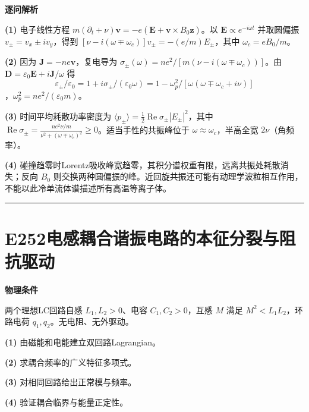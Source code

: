 \documentclass[UTF8,a4paper,11pt,oneside,openany]{ctexbook}
\begin{document}
\par\medskip\noindent\textbf{逐问解析}
\par\noindent\textbf{(1)} 电子线性方程 \(m(\partial_t+\nu)\boldsymbol v=-e(\boldsymbol E+\boldsymbol v\times B_0\hat{\boldsymbol z})\)。以 \(\boldsymbol E\propto e^{-i\omega t}\) 并取圆偏振 \(v_\pm=v_x\pm iv_y\)，得到 \([\nu-i(\omega\mp\omega_c)]v_\pm=-(e/m)E_\pm\)，其中 \(\omega_c=eB_0/m\)。
\par\noindent\textbf{(2)} 因为 \(\boldsymbol J=-ne\boldsymbol v\)，复电导为 \(\sigma_\pm(\omega)=ne^2/[m(\nu-i(\omega\mp\omega_c))]\)。由 \(\boldsymbol D=\varepsilon_0\boldsymbol E+i\boldsymbol J/\omega\) 得 \[\varepsilon_\pm/\varepsilon_0=1+i\sigma_\pm/(\varepsilon_0\omega)=1-\omega_p^2/[\omega(\omega\mp\omega_c+i\nu)]\]，\(\omega_p^2=ne^2/(\varepsilon_0m)\)。
\par\noindent\textbf{(3)} 时间平均耗散功率密度为 \(\langle p_\pm\rangle=\tfrac12\operatorname{Re}\sigma_\pm|E_\pm|^2\)，其中 \(\operatorname{Re}\sigma_\pm=\frac{ne^2\nu/m}{\nu^2+(\omega\mp\omega_c)^2}\ge0\)。适当手性的共振峰位于 \(\omega\approx\omega_c\)，半高全宽 \(2\nu\)（角频率）。
\par\noindent\textbf{(4)} 碰撞趋零时Lorentz吸收峰宽趋零，其积分谱权重有限，远离共振处耗散消失；反向 \(B_0\) 则交换两种圆偏振的峰。近回旋共振还可能有动理学波粒相互作用，不能以此冷单流体谱描述所有高温等离子体。

\par\bigskip\hrule\bigskip
\section*{E252\quad 电感耦合谐振电路的本征分裂与阻抗驱动}
\textbf{物理条件}\par 两个理想LC回路自感 \(L_1,L_2>0\)、电容 \(C_1,C_2>0\)，互感 \(M\) 满足 \(M^2<L_1L_2\)，环路电荷 \(q_1,q_2\)。无电阻、无外驱动。
\par\noindent\textbf{(1)} 由磁能和电能建立双回路Lagrangian。
\par\noindent\textbf{(2)} 求耦合频率的广义特征多项式。
\par\noindent\textbf{(3)} 对相同回路给出正常模与频率。
\par\noindent\textbf{(4)} 验证耦合临界与能量正定性。
\end{document}
